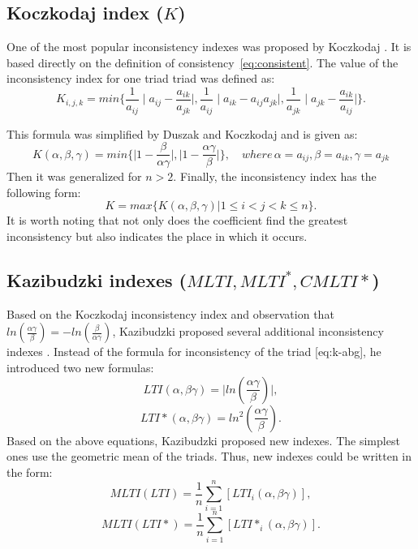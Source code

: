 \subsection{Koczkodaj index ($K$)}

One of the most popular inconsistency indexes was proposed by Koczkodaj \cite{KOCZKODAJ1993}. It is based directly on the definition of consistency~\ref{eq:consistent}. The value of the inconsistency index for one triad triad was defined as:
	\begin{equation} 
		\label{eq:K}
		K_{i,j,k}=min\{\frac{1}{a_{ij}}\mid a_{ij}-\frac{a_{ik}}{a_{jk}}\mid,\frac{1}{a_{ij}}\mid a_{ik}-a_{ij}a_{jk}\mid,\frac{1}{a_{jk}}\mid a_{jk}-\frac{a_{ik}}{a_{ij}}\mid\}.
	 \end{equation}

 This formula was simplified by Duszak and Koczkodaj \cite{DUSZAK1994} and is given as:
 	\begin{equation} 
		K(\alpha,\beta,\gamma)=min\{\mid1-\frac{\beta}{\alpha\gamma}\mid,\mid1-\frac{\alpha\gamma}{\beta}\mid\},\,\,\,\,\,\,where\,\alpha=a_{ij},\beta=a_{ik},\gamma=a_{jk}
	 \end{equation}
 Then it was generalized \cite{DUSZAK1994} for $n>2$. Finally, the inconsistency index has the following form:
 	\begin{equation} 
		K=max\{K(\alpha,\beta,\gamma)|1\leq i<j<k\leq n\}.
	 \end{equation}
 It is worth noting that not only does the coefficient find the greatest inconsistency but also indicates the place in which it occurs.


\subsection{Kazibudzki indexes ($MLTI, MLTI^{*}, CMLTI*$)}

Based on the Koczkodaj inconsistency index and observation that $ln(\frac{\alpha\gamma}{\beta})=-ln(\frac{\beta}{\alpha\gamma})$, Kazibudzki proposed several additional inconsistency indexes \cite{Kazibudzki2016}. Instead of the formula for inconsistency of the triad [eq:k-abg], he introduced two new formulas:
	\begin{equation} 
		LTI(\alpha,\beta\gamma)=\mid ln(\frac{\alpha\gamma}{\beta})\mid,
	 \end{equation}
	\begin{equation}
		\label{eq:lti*} 
		LTI*(\alpha,\beta\gamma)=ln^{2}(\frac{\alpha\gamma}{\beta}).
	 \end{equation}
Based on the above equations, Kazibudzki proposed new indexes. The simplest ones use the geometric mean of the triads. Thus, new indexes could be written in the form:
	\begin{equation} 
		MLTI(LTI)=\frac{1}{n}\sum_{i=1}^{n}\left[LTI_{i}(\alpha,\beta\gamma)\right],
	 \end{equation}
 	\begin{equation} 
		MLTI(LTI*)=\frac{1}{n}\sum_{i=1}^{n}\left[LTI*_{i}(\alpha,\beta\gamma)\right].
			 \end{equation}
 

